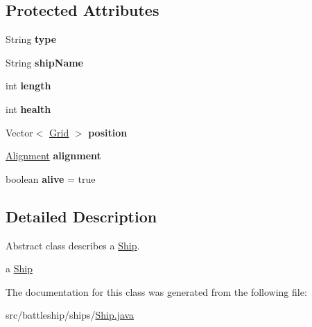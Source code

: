 \subsection*{Protected Attributes}
\begin{DoxyCompactItemize}
\item 
\hypertarget{classbattleship_1_1ships_1_1Ship_aa502fc3e670f504bd448f774d5889dbc}{}String {\bfseries type}\label{classbattleship_1_1ships_1_1Ship_aa502fc3e670f504bd448f774d5889dbc}

\item 
\hypertarget{classbattleship_1_1ships_1_1Ship_a14f943bf3facd2ddc983fd73fdf8ac1c}{}String {\bfseries ship\+Name}\label{classbattleship_1_1ships_1_1Ship_a14f943bf3facd2ddc983fd73fdf8ac1c}

\item 
\hypertarget{classbattleship_1_1ships_1_1Ship_a0b9214c6aee1537fd9489dc328e0fde6}{}int {\bfseries length}\label{classbattleship_1_1ships_1_1Ship_a0b9214c6aee1537fd9489dc328e0fde6}

\item 
\hypertarget{classbattleship_1_1ships_1_1Ship_a1eaa609f1e4a6ea5ee6535832489a005}{}int {\bfseries health}\label{classbattleship_1_1ships_1_1Ship_a1eaa609f1e4a6ea5ee6535832489a005}

\item 
\hypertarget{classbattleship_1_1ships_1_1Ship_a433ea8e48e3185e38ca607a5d066ae54}{}Vector$<$ \hyperlink{classbattleship_1_1gameboard_1_1Grid}{Grid} $>$ {\bfseries position}\label{classbattleship_1_1ships_1_1Ship_a433ea8e48e3185e38ca607a5d066ae54}

\item 
\hypertarget{classbattleship_1_1ships_1_1Ship_ad5a98edf9c4e260e8ebfc0dd696e85f3}{}\hyperlink{enumbattleship_1_1ships_1_1Alignment}{Alignment} {\bfseries alignment}\label{classbattleship_1_1ships_1_1Ship_ad5a98edf9c4e260e8ebfc0dd696e85f3}

\item 
\hypertarget{classbattleship_1_1ships_1_1Ship_a451ab8a917492053b21c7576cbd9d856}{}boolean {\bfseries alive} = true\label{classbattleship_1_1ships_1_1Ship_a451ab8a917492053b21c7576cbd9d856}

\end{DoxyCompactItemize}


\subsection{Detailed Description}
Abstract class describes a \hyperlink{classbattleship_1_1ships_1_1Ship}{Ship}. 

a \hyperlink{classbattleship_1_1ships_1_1Ship}{Ship} 

The documentation for this class was generated from the following file\+:\begin{DoxyCompactItemize}
\item 
src/battleship/ships/\hyperlink{Ship_8java}{Ship.\+java}\end{DoxyCompactItemize}
